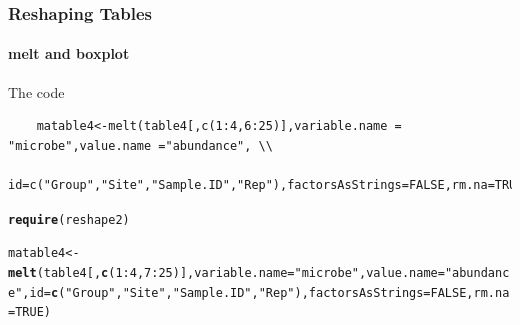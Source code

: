 \documentclass[10pt,handout,english]{beamer}\usepackage[]{graphicx}\usepackage[]{color}
\makeatletter
\newcommand{\hlnum}[1]{\textcolor[rgb]{0.686,0.059,0.569}{#1}}%
\newcommand{\hlstr}[1]{\textcolor[rgb]{0.192,0.494,0.8}{#1}}%
\newcommand{\hlopt}[1]{\textcolor[rgb]{0,0,0}{#1}}%
\newcommand{\hlstd}[1]{\textcolor[rgb]{0.345,0.345,0.345}{#1}}%
\newcommand{\hlkwb}[1]{\textcolor[rgb]{0.69,0.353,0.396}{#1}}%
\newcommand{\hlkwc}[1]{\textcolor[rgb]{0.333,0.667,0.333}{#1}}%
\newcommand{\hlkwd}[1]{\textcolor[rgb]{0.737,0.353,0.396}{\textbf{#1}}}%
\newenvironment{kframe}{%
 \def\at@end@of@kframe{}%
 \ifinner\ifhmode%
  \def\at@end@of@kframe{\end{minipage}}%
  \begin{minipage}{\columnwidth}%
 \fi\fi%
 \def\FrameCommand##1{\hskip\@totalleftmargin \hskip-\fboxsep
 \colorbox{shadecolor}{##1}\hskip-\fboxsep
     \hskip-\linewidth \hskip-\@totalleftmargin \hskip\columnwidth}%
 \MakeFramed {\advance\hsize-\width
   \@totalleftmargin\z@ \linewidth\hsize
   \@setminipage}}%
 {\par\unskip\endMakeFramed%
 \at@end@of@kframe}
\newenvironment{knitrout}{}{} %
\makeatother
\begin{document}
\begin{frame}[fragile]
  \frametitle{Reshaping Tables}
  \framesubtitle{melt and boxplot}
  \begin{block}{The code}
  \end{block}
    \begin{lstlisting}
    matable4<-melt(table4[,c(1:4,6:25)],variable.name = "microbe",value.name ="abundance", \\
    id=c("Group","Site","Sample.ID","Rep"),factorsAsStrings=FALSE,rm.na=TRUE)
   \end{lstlisting}
\begin{knitrout}
\color{fgcolor}\begin{kframe}
\begin{alltt}
\hlkwd{require}\hlstd{(reshape2)}
\end{alltt}


{\ttfamily\noindent\itshape\color{messagecolor}{\#\# Loading required package: reshape2}}\begin{alltt}
\hlstd{matable4}\hlkwb{<-}\hlkwd{melt}\hlstd{(table4[,}\hlkwd{c}\hlstd{(}\hlnum{1}\hlopt{:}\hlnum{4}\hlstd{,}\hlnum{7}\hlopt{:}\hlnum{25}\hlstd{)],}\hlkwc{variable.name} \hlstd{=} \hlstr{"microbe"}\hlstd{,}\hlkwc{value.name} \hlstd{=}\hlstr{"abundance"}\hlstd{,} \hlkwc{id}\hlstd{=}\hlkwd{c}\hlstd{(}\hlstr{"Group"}\hlstd{,}\hlstr{"Site"}\hlstd{,}\hlstr{"Sample.ID"}\hlstd{,}\hlstr{"Rep"}\hlstd{),}\hlkwc{factorsAsStrings}\hlstd{=}\hlnum{FALSE}\hlstd{,}\hlkwc{rm.na}\hlstd{=}\hlnum{TRUE}\hlstd{)}
\end{alltt}
\end{kframe}
\end{knitrout}

\end{frame}  
\end{document}
